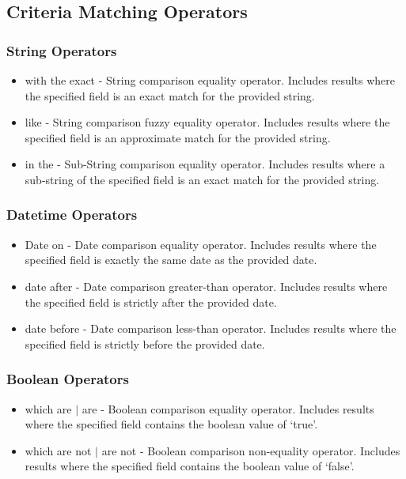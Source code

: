 \subsection{Criteria Matching Operators}
\subsubsection{String Operators}
\label{sub:DerpOperators}
\begin{itemize}
\item with the exact - String comparison equality operator. Includes results where the specified field is an exact match for the provided string.
\item like - String comparison fuzzy equality operator. Includes results where the specified field is an approximate match for the provided string.
\item in the - Sub-String comparison equality operator. Includes results where a sub-string of the specified field is an exact match for the provided string.
\end{itemize}
\subsubsection{Datetime Operators}
\begin{itemize}
\item Date on - Date comparison equality operator. Includes results where the specified field is exactly the same date as the provided date.
\item date after - Date comparison greater-than operator. Includes results where the specified field is strictly after the provided date.
\item date before - Date comparison less-than operator. Includes results where the specified field is strictly before the provided date.
\end{itemize}
\subsubsection{Boolean Operators}
\begin{itemize}
\item which are $|$ are - Boolean comparison equality operator. Includes results where the specified field contains the boolean value of `true'.
\item which are not $|$ are not - Boolean comparison non-equality operator. Includes results where the specified field contains the boolean value of `false'.
\end{itemize}
